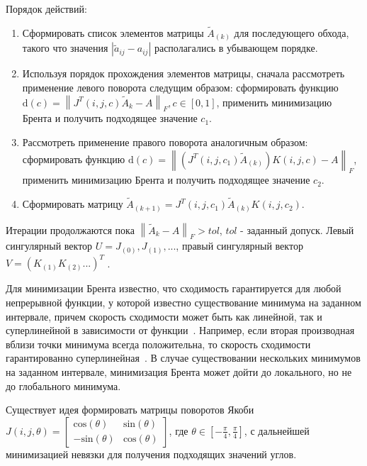 Порядок действий:
\begin{enumerate}
    \item Сформировать список элементов матрицы $\tilde{A}_{(k)}$ для последующего обхода, такого что значения $|\tilde{a}_{ij} - a_{ij}|$ располагались в убывающем порядке.
    \item Используя порядок прохождения элементов матрицы, сначала рассмотреть применение левого поворота следущим образом: сформировать функцию \newline$\mathrm{d}(c)= \left\|J^T(i,j,c)\tilde{A}_{k} - A\right\|_F, c \in [0, 1]$, применить минимизацию Брента и получить подходящее значение $c_1$.
    \item Рассмотреть применение правого поворота аналогичным образом: сформировать функцию $\mathrm{d}(c) = \left\| (J^T(i,j,c_1)\tilde{A}_{(k)})K(i,j, c) - A \right\|_F$, применить минимизацию Брента и получить подходящее значение $c_2$.
    \item Сформировать матрицу $\tilde{A}_{(k+1)} =J^T(i,j,c_1)\tilde{A}_{(k)}K(i,j,c_2).$ 
    
\end{enumerate}

Итерации продолжаются пока $\left\| \tilde{A}_{k} - A\right\|_F >tol$, $tol$ - заданный допуск. Левый сингулярный вектор $U = J_{(0)}, J_{(1)}, ...$, правый сингулярный вектор $V = (K_{(1)}K_{(2)}...)^T$ .

Для минимизации Брента известно, что сходимость  гарантируется для любой непрерывной функции, у которой известно существование минимума на заданном интервале, причем скорость сходимости может быть как линейной, так и суперлинейной в зависимости от функции~\cite{Brent_2013}. Например, если вторая производная вблизи точки минимума всегда положительна, то скорость сходимости гарантированно суперлинейная~\cite{Brent1971}. В случае существовании нескольких минимумов на заданном интервале, минимизация Брента может дойти до локального, но не до глобального минимума. 

\begin{note}
    Существует идея формировать матрицы поворотов Якоби $J(i,j,\theta) = \begin{bmatrix}
        \mathrm{cos}(\theta)&\mathrm{sin}(\theta)\\
        \mathrm{-sin}(\theta)&\mathrm{cos}(\theta)
    \end{bmatrix}$, где $\theta \in [-\frac{\pi}{4}, \frac{\pi}{4}]$, с дальнейшей минимизацией невязки для получения подходящих значений углов. 
\end{note}

